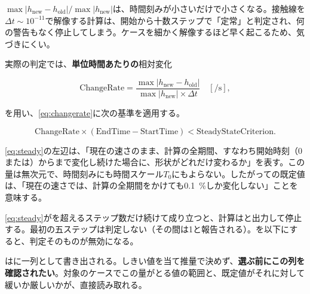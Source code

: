 \begin{warn}[定常かどうかをステップあたりの変化で判定しない]
  $\max\lvert h_{\mathrm{new}} - h_{\mathrm{old}}\rvert /
   \max\lvert h_{\mathrm{new}}\rvert$は、時間刻みが小さいだけで小さくなる。接触線を$\Delta t \sim 10^{-11}$で解像する計算は、開始から十数ステップで「定常」と判定され、何の警告もなく停止してしまう。ケースを細かく解像するほど早く起こるため、気づきにくい。
\end{warn}

実際の判定では、\textbf{単位時間あたりの}相対変化

\begin{equation}\label{eq:changerate}
  \mathrm{ChangeRate} =
    \frac{\max\lvert h_{\mathrm{new}} - h_{\mathrm{old}}\rvert}
         {\max\lvert h_{\mathrm{new}}\rvert \times \Delta t}
  \quad [\si{\per\second}],
\end{equation}

を用い、\cref{eq:changerate}に次の基準を適用する。

\begin{equation}\label{eq:steady}
  \mathrm{ChangeRate} \times (\mathrm{EndTime} - \mathrm{StartTime})
    < \mathrm{SteadyStateCriterion}.
\end{equation}

\cref{eq:steady}の左辺は、「現在の速さのまま、計算の全期間、すなわち開始時刻（$0$または）からまで変化し続けた場合に、形状がどれだけ変わるか」を表す。この量は無次元で、時間刻みにも時間スケール$T_0$にもよらない。したがっての既定値は、「現在の速さでは、計算の全期間をかけても\SI{0.1}{\percent}しか変化しない」ことを意味する。

\cref{eq:steady}がを超えるステップ数だけ続けて成り立つと、計算はと出力して停止する。最初の五ステップは判定しない（その間は1と報告される）。を以下にすると、判定そのものが無効になる。

はに一列として書き出される。しきい値を当て推量で決めず、\textbf{選ぶ前にこの列を確認されたい}。対象のケースでこの量がとる値の範囲と、既定値がそれに対して緩いか厳しいかが、直接読み取れる。
